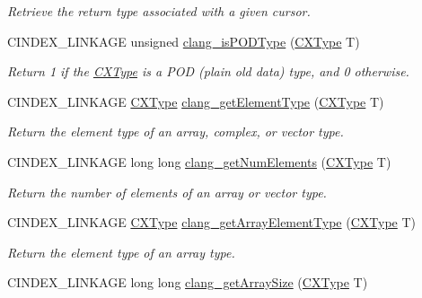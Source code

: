 \begin{DoxyCompactItemize}
\begin{DoxyCompactList}\small\item\em Retrieve the return type associated with a given cursor. \end{DoxyCompactList}\item 
\mbox{\label{group__CINDEX__TYPES_ga3e7fdbe3d246ed03298bd074c5b3703e}} 
C\+I\+N\+D\+E\+X\+\_\+\+L\+I\+N\+K\+A\+GE unsigned \hyperlink{group__CINDEX__TYPES_ga3e7fdbe3d246ed03298bd074c5b3703e}{clang\+\_\+is\+P\+O\+D\+Type} (\hyperlink{structCXType}{C\+X\+Type} T)
\begin{DoxyCompactList}\small\item\em Return 1 if the \hyperlink{structCXType}{C\+X\+Type} is a P\+OD (plain old data) type, and 0 otherwise. \end{DoxyCompactList}\item 
C\+I\+N\+D\+E\+X\+\_\+\+L\+I\+N\+K\+A\+GE \hyperlink{structCXType}{C\+X\+Type} \hyperlink{group__CINDEX__TYPES_gab35027c8bc48fab25f7698a415c93922}{clang\+\_\+get\+Element\+Type} (\hyperlink{structCXType}{C\+X\+Type} T)
\begin{DoxyCompactList}\small\item\em Return the element type of an array, complex, or vector type. \end{DoxyCompactList}\item 
C\+I\+N\+D\+E\+X\+\_\+\+L\+I\+N\+K\+A\+GE long long \hyperlink{group__CINDEX__TYPES_gac5f636020c388126bec572cb1fb13007}{clang\+\_\+get\+Num\+Elements} (\hyperlink{structCXType}{C\+X\+Type} T)
\begin{DoxyCompactList}\small\item\em Return the number of elements of an array or vector type. \end{DoxyCompactList}\item 
C\+I\+N\+D\+E\+X\+\_\+\+L\+I\+N\+K\+A\+GE \hyperlink{structCXType}{C\+X\+Type} \hyperlink{group__CINDEX__TYPES_ga718591f4b07d9d4861557a3ed8b29713}{clang\+\_\+get\+Array\+Element\+Type} (\hyperlink{structCXType}{C\+X\+Type} T)
\begin{DoxyCompactList}\small\item\em Return the element type of an array type. \end{DoxyCompactList}\item 
C\+I\+N\+D\+E\+X\+\_\+\+L\+I\+N\+K\+A\+GE long long \hyperlink{group__CINDEX__TYPES_ga91521260817054f153b5f1295056192d}{clang\+\_\+get\+Array\+Size} (\hyperlink{structCXType}{C\+X\+Type} T)

\end{DoxyCompactItemize}
